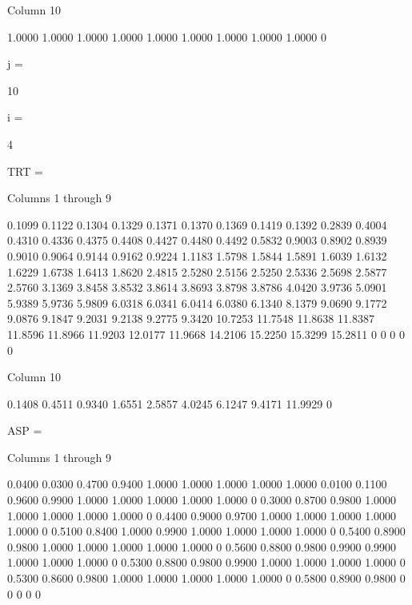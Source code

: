   Column 10

    1.0000
    1.0000
    1.0000
    1.0000
    1.0000
    1.0000
    1.0000
    1.0000
    1.0000
         0


j =

    10


i =

     4


TRT =

  Columns 1 through 9

    0.1099    0.1122    0.1304    0.1329    0.1371    0.1370    0.1369    0.1419    0.1392
    0.2839    0.4004    0.4310    0.4336    0.4375    0.4408    0.4427    0.4480    0.4492
    0.5832    0.9003    0.8902    0.8939    0.9010    0.9064    0.9144    0.9162    0.9224
    1.1183    1.5798    1.5844    1.5891    1.6039    1.6132    1.6229    1.6738    1.6413
    1.8620    2.4815    2.5280    2.5156    2.5250    2.5336    2.5698    2.5877    2.5760
    3.1369    3.8458    3.8532    3.8614    3.8693    3.8798    3.8786    4.0420    3.9736
    5.0901    5.9389    5.9736    5.9809    6.0318    6.0341    6.0414    6.0380    6.1340
    8.1379    9.0690    9.1772    9.0876    9.1847    9.2031    9.2138    9.2775    9.3420
   10.7253   11.7548   11.8638   11.8387   11.8596   11.8966   11.9203   12.0177   11.9668
   14.2106   15.2250   15.3299   15.2811         0         0         0         0         0

  Column 10

    0.1408
    0.4511
    0.9340
    1.6551
    2.5857
    4.0245
    6.1247
    9.4171
   11.9929
         0


ASP =

  Columns 1 through 9

    0.0400    0.0300    0.4700    0.9400    1.0000    1.0000    1.0000    1.0000    1.0000
    0.0100    0.1100    0.9600    0.9900    1.0000    1.0000    1.0000    1.0000    1.0000
         0    0.3000    0.8700    0.9800    1.0000    1.0000    1.0000    1.0000    1.0000
         0    0.4400    0.9000    0.9700    1.0000    1.0000    1.0000    1.0000    1.0000
         0    0.5100    0.8400    1.0000    0.9900    1.0000    1.0000    1.0000    1.0000
         0    0.5400    0.8900    0.9800    1.0000    1.0000    1.0000    1.0000    1.0000
         0    0.5600    0.8800    0.9800    0.9900    0.9900    1.0000    1.0000    1.0000
         0    0.5300    0.8800    0.9800    0.9900    1.0000    1.0000    1.0000    1.0000
         0    0.5300    0.8600    0.9800    1.0000    1.0000    1.0000    1.0000    1.0000
         0    0.5800    0.8900    0.9800         0         0         0         0         0

